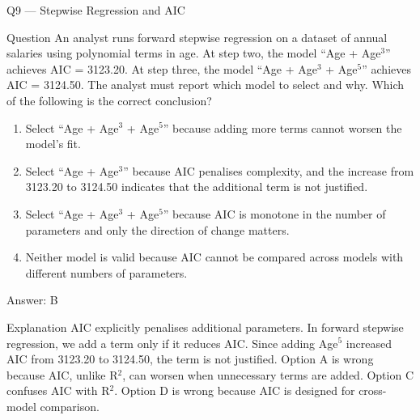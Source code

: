\documentclass[aspectratio=169,8pt]{beamer}
\begin{document}
	\begin{frame}{Q9 --- Stepwise Regression and AIC}
		\begin{block}{Question}
			An analyst runs forward stepwise regression on a dataset of annual salaries using polynomial terms in age. At step two, the model ``Age + Age$^3$'' achieves AIC = 3123.20. At step three, the model ``Age + Age$^3$ + Age$^5$'' achieves AIC = 3124.50. The analyst must report which model to select and why. Which of the following is the correct conclusion?
		\end{block}
		\begin{enumerate}
			\item Select ``Age + Age$^3$ + Age$^5$'' because adding more terms cannot worsen the model's fit.
			\item Select ``Age + Age$^3$'' because AIC penalises complexity, and the increase from 3123.20 to 3124.50 indicates that the additional term is not justified.
			\item Select ``Age + Age$^3$ + Age$^5$'' because AIC is monotone in the number of parameters and only the direction of change matters.
			\item Neither model is valid because AIC cannot be compared across models with different numbers of parameters.
		\end{enumerate}
		\begin{exampleblock}{Answer: B}\end{exampleblock}
		\begin{block}{Explanation}
			AIC explicitly penalises additional parameters. In forward stepwise regression, we add a term only if it reduces AIC. Since adding Age$^5$ increased AIC from 3123.20 to 3124.50, the term is not justified. Option A is wrong because AIC, unlike R$^2$, can worsen when unnecessary terms are added. Option C confuses AIC with R$^2$. Option D is wrong because AIC is designed for cross-model comparison.
		\end{block}
	\end{frame}
	
\end{document}
